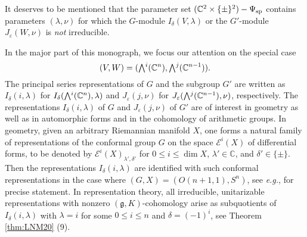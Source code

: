 \bigskip
It deserves to be mentioned
 that the parameter set $({\mathbb{C}}^2 \times \{\pm\}^2)- \Psi_{{\operatorname{sp}}}$ contains parameters $(\lambda,\nu)$
 for which the $G$-module $I_{\delta}(V,\lambda)$
 or the $G'$-module $J_{\varepsilon}(W,\nu)$
 is {\it{not}} irreducible.  


\vskip 2pc
In the major part of this monograph,
 we focus our attention on the special case
\[
  (V,W)=(\Exterior^i({\mathbb{C}}^{n}), \Exterior^j({\mathbb{C}}^{n-1})).  
\]
The principal series representations
 of $G$ and the subgroup $G'$
 are written as $I_{\delta}(i,\lambda)$ for $I_{\delta}(\Exterior^i({\mathbb{C}}^{n}),\lambda)$
 and $J_{\varepsilon}(j,\nu)$ for $J_{\varepsilon}(\Exterior^j({\mathbb{C}}^{n-1}),\nu)$, 
 respectively.  
The representations
 $I_\delta(i,\lambda)$ of $G$
 and $J_{\varepsilon}(j,\nu)$ of $G'$ are of  interest in geometry as well as in automorphic forms and in the cohomology of arithmetic groups. 
In geometry, 
 given an arbitrary Riemannian manifold $X$, 
 one forms a natural family of representations
 of the conformal group $G$
 on the space ${\mathcal{E}}^i(X)$ of differential forms,
 to be denoted by ${\mathcal{E}}^i(X)_{\lambda',\delta'}$
 for $0 \le i \le \dim X$, $\lambda' \in {\mathbb{C}}$, 
 and $\delta' \in \{\pm\}$.  
Then the representations $I_\delta(i,\lambda)$
 are identified with such conformal representations
 in the case where $(G, X)=(O(n+1,1), S^n)$, 
 see {\it{e.g.}}, \cite[Chap.~2, Sect.~2]{KKP}
 for precise statement.  
In representation theory,
 all irreducible, unitarizable representations
 with nonzero $({\mathfrak{g}}, K)$-cohomology arise
 as subquotients of $I_{\delta}(i,\lambda)$ with $\lambda=i$
 for some $0 \le i \le n$
 and $\delta=(-1)^i$, 
 see Theorem \ref{thm:LNM20} (9).   



